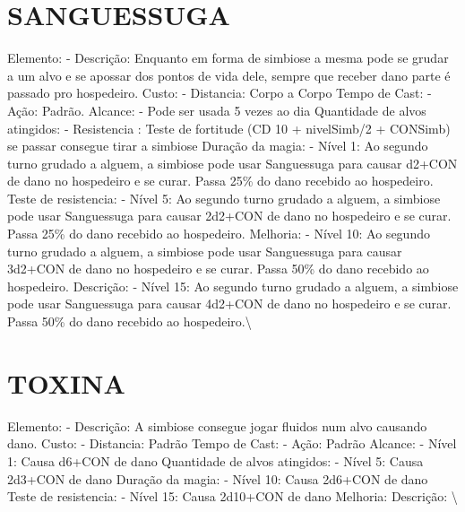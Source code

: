 \documentclass{article}%
\begin{document}
%
\section{SANGUESSUGA}%
\label{sec:SANGUESSUGA}%
Elemento: {-} Descrição: Enquanto em forma de simbiose a mesma pode se grudar a um alvo e se apossar dos pontos de vida dele, sempre que receber dano parte é passado pro hospedeiro.\newline%
Custo: {-} Distancia: Corpo a Corpo\newline%
Tempo de Cast: {-} Ação: Padrão.\newline%
Alcance: {-} Pode ser usada 5 vezes ao dia\newline%
Quantidade de alvos atingidos: {-} Resistencia : Teste de fortitude (CD 10 + nivelSimb/2 + CONSimb) se passar consegue tirar a simbiose\newline%
Duração da magia: {-} Nível 1: Ao segundo turno grudado a alguem, a simbiose pode usar Sanguessuga para causar d2+CON de dano no hospedeiro e se curar. Passa 25\% do dano recebido ao hospedeiro.\newline%
Teste de resistencia: {-} Nível 5: Ao segundo turno grudado a alguem, a simbiose pode usar Sanguessuga para causar 2d2+CON de dano no hospedeiro e se curar. Passa 25\% do dano recebido ao hospedeiro.\newline%
Melhoria: {-} Nível 10: Ao segundo turno grudado a alguem, a simbiose pode usar Sanguessuga para causar 3d2+CON de dano no hospedeiro e se curar. Passa 50\% do dano recebido ao hospedeiro.\newline%
Descrição: {-} Nível 15: Ao segundo turno grudado a alguem, a simbiose pode usar Sanguessuga para causar 4d2+CON de dano no hospedeiro e se curar. Passa 50\% do dano recebido ao hospedeiro.\textbackslash{}

%
\section{TOXINA}%
\label{sec:TOXINA}%
Elemento: {-} Descrição: A simbiose consegue jogar fluidos num alvo causando dano.\newline%
Custo: {-} Distancia: Padrão\newline%
Tempo de Cast: {-} Ação: Padrão\newline%
Alcance: {-} Nível 1: Causa d6+CON de dano\newline%
Quantidade de alvos atingidos: {-} Nível 5: Causa 2d3+CON de dano\newline%
Duração da magia: {-} Nível 10: Causa 2d6+CON de dano\newline%
Teste de resistencia: {-} Nível 15: Causa 2d10+CON de dano\newline%
Melhoria: \newline%
Descrição: \textbackslash{}
\end{document}
